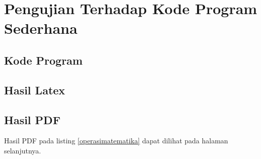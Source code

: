 \chapter{Pengujian Terhadap Kode Program Sederhana}
\label{lamp:A}

\section{Kode Program}





\section{Hasil Latex}

\section{Hasil PDF}
Hasil PDF pada listing \ref{operasimatematika} dapat dilihat pada halaman selanjutnya.












